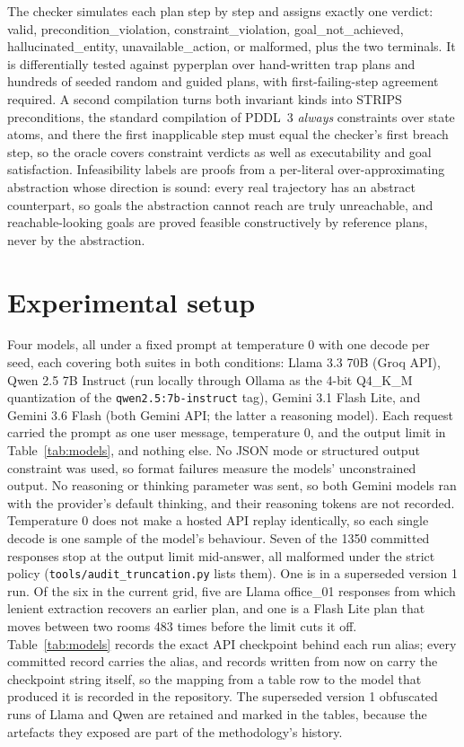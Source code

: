 \documentclass[10pt]{article}
\begin{document}
The checker simulates each plan step by step and assigns exactly one
verdict: valid, precondition\_violation, constraint\_violation,
goal\_not\_achieved, hallucinated\_entity, unavailable\_action, or
malformed, plus the two terminals. It is differentially tested against
pyperplan over hand-written trap plans and hundreds of seeded random and
guided plans, with first-failing-step agreement required. A second
compilation turns both invariant kinds into STRIPS preconditions, the
standard compilation of PDDL~3 \emph{always} constraints over state
atoms, and there the first inapplicable step must equal the checker's
first breach step, so the oracle covers constraint verdicts as well as
executability and goal satisfaction. Infeasibility labels are proofs from a per-literal
over-approximating abstraction whose direction is sound: every real
trajectory has an abstract counterpart, so goals the abstraction cannot
reach are truly unreachable, and reachable-looking goals are proved
feasible constructively by reference plans, never by the abstraction.

\section{Experimental setup}

Four models, all under a fixed prompt at temperature 0 with one decode
per seed, each covering both suites in both conditions: Llama 3.3 70B
(Groq API), Qwen 2.5 7B Instruct (run locally through Ollama as the
4-bit Q4\_K\_M quantization of the \texttt{qwen2.5:7b-instruct} tag),
Gemini 3.1 Flash Lite, and Gemini 3.6 Flash (both Gemini API; the
latter a reasoning model). Each request carried the prompt
as one user message, temperature 0, and the output limit in
Table~\ref{tab:models}, and nothing else. No JSON mode or structured
output constraint was used, so format failures measure the models'
unconstrained output. No reasoning or thinking parameter was sent, so
both Gemini models ran with the provider's default thinking, and their
reasoning tokens are not recorded. Temperature 0 does not make a hosted
API replay identically, so each single decode is one sample of the
model's behaviour. Seven of the 1350 committed responses stop at the
output limit mid-answer, all malformed under the strict policy
(\texttt{tools/audit\_truncation.py} lists them). One is in a
superseded version 1 run. Of the six in the current grid, five are
Llama office\_01 responses from which lenient extraction recovers an
earlier plan, and one is a Flash Lite plan that moves between two
rooms 483 times before the limit cuts it off.
Table~\ref{tab:models} records the exact API checkpoint behind each
run alias; every committed record carries the alias, and records
written from now on carry the checkpoint string itself, so the mapping
from a table row to the model that produced it is recorded in the
repository. The superseded version 1 obfuscated runs of Llama and
Qwen are retained and marked in the tables, because the artefacts they
exposed are part of the methodology's history.
\end{document}
